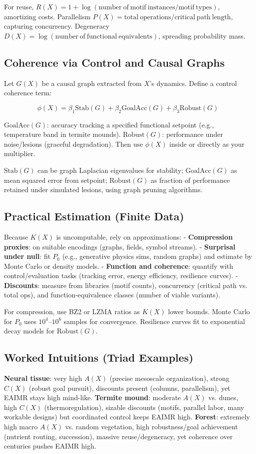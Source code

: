 \documentclass{article}
\begin{document}
For reuse, $R(X) = 1 + \log(\mathrm{number\ of\ motif\ instances} / \mathrm{motif\ types})$, amortizing costs. Parallelism $P(X) = \mathrm{total\ operations} / \mathrm{critical\ path\ length}$, capturing concurrency. Degeneracy $D(X) = \log(\mathrm{number\ of\ functional\ equivalents})$, spreading probability mass.

\subsection{Coherence via Control and Causal Graphs}
Let $G(X)$ be a causal graph extracted from $X$’s dynamics. Define a control coherence term:

\[ \phi(X) = \beta_1 \mathrm{Stab}(G) + \beta_2 \mathrm{GoalAcc}(G) + \beta_3 \mathrm{Robust}(G) \]

$\mathrm{GoalAcc}(G)$: accuracy tracking a specified functional setpoint (e.g., temperature band in termite mounds). $\mathrm{Robust}(G)$: performance under noise/lesions (graceful degradation). Then use $\phi(X)$ inside or directly as your multiplier.

$\mathrm{Stab}(G)$ can be graph Laplacian eigenvalues for stability; $\mathrm{GoalAcc}(G)$ as mean squared error from setpoint; $\mathrm{Robust}(G)$ as fraction of performance retained under simulated lesions, using graph pruning algorithms.

\subsection{Practical Estimation (Finite Data)}
Because $K(X)$ is uncomputable, rely on approximations:
- \textbf{Compression proxies}: on suitable encodings (graphs, fields, symbol streams).
- \textbf{Surprisal under null}: fit $P_0$ (e.g., generative physics sims, random graphs) and estimate by Monte Carlo or density models.
- \textbf{Function and coherence}: quantify with control/evaluation tasks (tracking error, energy efficiency, resilience curves).
- \textbf{Discounts}: measure from libraries (motif counts), concurrency (critical path vs. total ops), and function-equivalence classes (number of viable variants).

For compression, use BZ2 or LZMA ratios as $K(X)$ lower bounds. Monte Carlo for $P_0$ uses $10^4$--$10^6$ samples for convergence. Resilience curves fit to exponential decay models for $\mathrm{Robust}(G)$.

\subsection{Worked Intuitions (Triad Examples)}
\textbf{Neural tissue}: very high $A(X)$ (precise mesoscale organization), strong $C(X)$ (robust goal pursuit), discounts present (columns, parallelism), yet EAIMR stays high mind-like. \textbf{Termite mound}: moderate $A(X)$ vs. dunes, high $C(X)$ (thermoregulation), sizable discounts (motifs, parallel labor, many workable designs) but coordinated control keeps EAIMR high. \textbf{Forest}: extremely high macro $A(X)$ vs. random vegetation, high robustness/goal achievement (nutrient routing, succession), massive reuse/degeneracy, yet coherence over centuries pushes EAIMR high.
\end{document}
